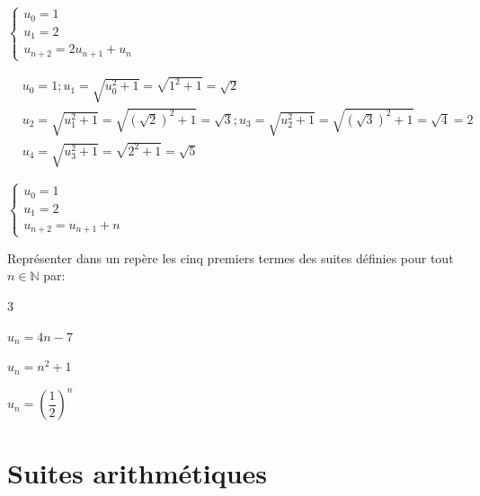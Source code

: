 \documentclass[11pt,a4paper]{article}  %
\begin{document}
\begin{enumMet}
\begin{corrBox}
		\end{corrBox}
		\item $\left\{\begin{array}{l}u_0=1 \\ u_1=2 \\ u_{n+2}=2 u_{n+1}+u_n\end{array}\right.$
		\begin{corrBox}
			$$
			\begin{aligned}
				& u_0=1 ; u_1=\sqrt{u_0^2+1}=\sqrt{1^2+1}=\sqrt{2} \\
				& u_2=\sqrt{u_1^2+1}=\sqrt{(\sqrt{2})^2+1}=\sqrt{3} ; u_3=\sqrt{u_2^2+1}=\sqrt{(\sqrt{3})^2+1}=\sqrt{4}=2 \\
				& u_4=\sqrt{u_3^2+1}=\sqrt{2^2+1}=\sqrt{5}
			\end{aligned}
			$$		
		\end{corrBox}
		\item $\left\{\begin{array}{l}u_0=1 \\ u_1=2 \\ u_{n+2}=u_{n+1}+n\end{array}\right.$
	\end{enumMet}


Représenter dans un repère les cinq premiers termes des suites définies pour tout $n \in \mathbb{N}$ par:
\begin{multicols}{3}
	\begin{enumMet}
	\item $u_n=4 n-7$
	\item $u_n=n^2+1$
	\item $u_n=\left(\dfrac{1}{2}\right)^n$
\end{enumMet}
\end{multicols}

\section{Suites arithmétiques}

\end{document}
